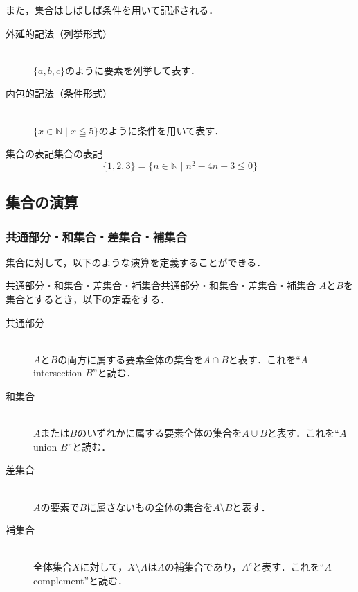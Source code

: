 \documentclass[a4paper,11pt]{ltjsarticle}
\renewcommand{\leq}{\leqq}
\begin{document}
また，集合はしばしば条件を用いて記述される．

\begin{description}
  \item[外延的記法（列挙形式）] \mbox{} \\
        $\{ a, b, c \}$のように要素を列挙して表す．
  \item[内包的記法（条件形式）] \mbox{} \\
        $\{ x \in \mathbb{N} \mid x \leq 5 \}$のように条件を用いて表す．
\end{description}


\begin{example}{集合の表記}{集合の表記}
  \[
    \{ 1,2,3 \} = \{ n \in \mathbb{N} \mid  n^2 -4n +3 \leqq 0 \}
  \]
\end{example}

\subsection{集合の演算}

\subsubsection{共通部分・和集合・差集合・補集合}
集合に対して，以下のような演算を定義することができる．

\begin{definition}{共通部分・和集合・差集合・補集合}{共通部分・和集合・差集合・補集合}
  $A$と$B$を集合とするとき，以下の定義をする．
  \begin{description}
    \item[共通部分] \mbox{}\\
          $A$と$B$の両方に属する要素全体の集合を$A \cap B$と表す．これを``$A$ intersection $B$''と読む．
    \item[和集合] \mbox{} \\
          $A$または$B$のいずれかに属する要素全体の集合を$A \cup B$と表す．これを``$A$ union $B$''と読む．
    \item[差集合]\mbox{}\\
          $A$の要素で$B$に属さないもの全体の集合を$A \setminus B$と表す．
    \item[補集合] \mbox{}\\
          全体集合$X$に対して，$X \setminus A$は$A$の補集合であり，$A^c$と表す．これを``$A$ complement''と読む．
  \end{description}
\end{definition}
\end{document}
